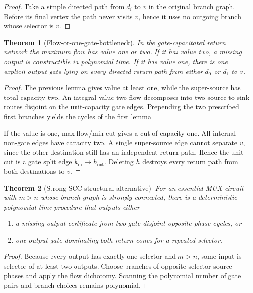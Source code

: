 \documentclass[11pt]{article}
\newtheorem{theorem}{Theorem}
\begin{document}
\begin{proof}
Take a simple directed path from $d_i$ to $v$ in the original branch graph.
Before its final vertex the path never visits $v$, hence it uses no outgoing
branch whose selector is $v$.
\end{proof}

\begin{theorem}[Flow-or-one-gate-bottleneck]
In the gate-capacitated return network the maximum flow has value one or two.
If it has value two, a missing output is constructible in polynomial time.  If
it has value one, there is one explicit output gate lying on every directed
return path from either $d_0$ or $d_1$ to $v$.
\end{theorem}

\begin{proof}
The previous lemma gives value at least one, while the super-source has total
capacity two.  An integral value-two flow decomposes into two source-to-sink
routes disjoint on the unit-capacity gate edges.  Prepending the two prescribed
first branches yields the cycles of the first lemma.

If the value is one, max-flow/min-cut gives a cut of capacity one.  All internal
non-gate edges have capacity two.  A single super-source edge cannot separate
$v$, since the other destination still has an independent return path.  Hence
the unit cut is a gate split edge $h_{\mathrm{in}}\to h_{\mathrm{out}}$.
Deleting $h$ destroys every return path from both destinations to $v$.
\end{proof}

\begin{theorem}[Strong-SCC structural alternative]
For an essential MUX circuit with $m>n$ whose branch graph is strongly connected,
there is a deterministic polynomial-time procedure that outputs either
\begin{enumerate}
\item a missing-output certificate from two gate-disjoint opposite-phase cycles,
or
\item one output gate dominating both return cones for a repeated selector.
\end{enumerate}
\end{theorem}

\begin{proof}
Because every output has exactly one selector and $m>n$, some input is selector
of at least two outputs.  Choose branches of opposite selector source phases and
apply the flow dichotomy.  Scanning the polynomial number of gate pairs and
branch choices remains polynomial.
\end{proof}
\end{document}
